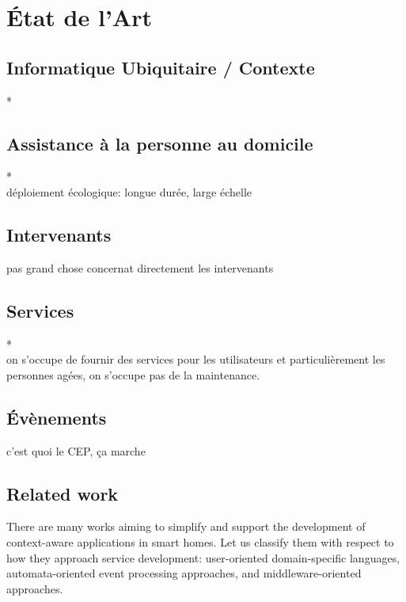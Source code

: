 \chapter{\'Etat de l'Art}
\section{Informatique Ubiquitaire / Contexte}
*
\section{Assistance à la personne au domicile}
*\\
déploiement écologique: longue durée, large échelle
\section{Intervenants}
pas grand chose concernat directement les intervenants
\section{Services}
*\\
on s'occupe de fournir des services pour les utilisateurs et particulièrement les personnes agées, on s'occupe pas de la maintenance.
\section{Évènements}
c'est quoi le CEP, ça marche


\section{Related work}
There are many works aiming to simplify and support the development of context-aware applications in smart homes. Let us classify them with respect to how they approach service development: user-oriented domain-specific languages, automata-oriented event processing approaches, and middleware-oriented approaches.

%

